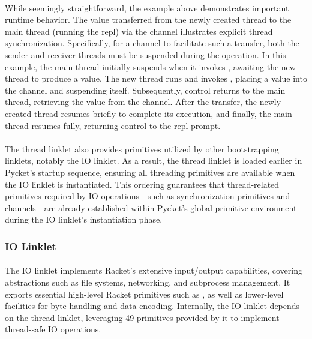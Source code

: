 				\paragraph{}%
					While seemingly straightforward, the example above demonstrates important runtime behavior. The value transferred from the newly created thread to the main thread (running the \gls{repl}) via the channel illustrates explicit thread synchronization. Specifically, for a channel to facilitate such a transfer, both the sender and receiver threads must be suspended during the operation. In this example, the main thread initially suspends when it invokes , awaiting the new thread to produce a value. The new thread runs and invokes , placing a value into the channel and suspending itself. Subsequently, control returns to the main thread, retrieving the value from the channel. After the transfer, the newly created thread resumes briefly to complete its execution, and finally, the main thread resumes fully, returning control to the \gls{repl} prompt.

				\paragraph{}%
					The thread linklet also provides primitives utilized by other bootstrapping linklets, notably the IO linklet. As a result, the thread linklet is loaded earlier in Pycket's startup sequence, ensuring all threading primitives are available when the IO linklet is instantiated. This ordering guarantees that thread-related primitives required by IO operations—such as synchronization primitives and channels—are already established within Pycket's global primitive environment during the IO linklet's instantiation phase.

			\subsubsection{IO Linklet}

				\paragraph{}%
					The IO linklet implements Racket's extensive input/output capabilities, covering abstractions such as file systems, networking, and subprocess management. It exports essential high-level Racket primitives such as , as well as lower-level facilities for byte handling and data encoding. Internally, the IO linklet depends on the thread linklet, leveraging 49 primitives provided by it to implement thread-safe IO operations.

